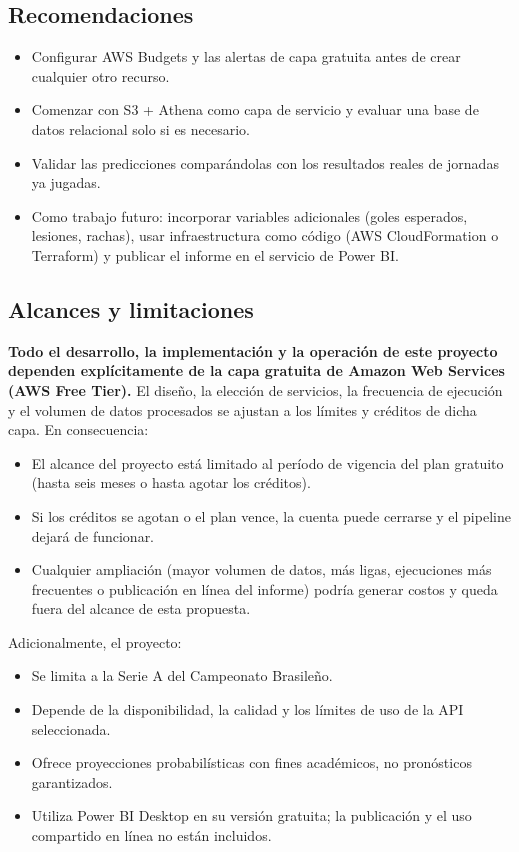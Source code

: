 \documentclass[11pt,a4paper]{article}
\begin{document}
\subsection{Recomendaciones}
\begin{itemize}
  \item Configurar AWS Budgets y las alertas de capa gratuita antes de crear cualquier otro recurso.
  \item Comenzar con S3 + Athena como capa de servicio y evaluar una base de datos relacional solo si es necesario.
  \item Validar las predicciones comparándolas con los resultados reales de jornadas ya jugadas.
  \item Como trabajo futuro: incorporar variables adicionales (goles esperados, lesiones, rachas), usar infraestructura como código (AWS CloudFormation o Terraform) y publicar el informe en el servicio de Power BI.
\end{itemize}

\subsection{Alcances y limitaciones}

\begin{alerta}
\textbf{Todo el desarrollo, la implementación y la operación de este proyecto dependen explícitamente de la capa gratuita de Amazon Web Services (AWS Free Tier).} El diseño, la elección de servicios, la frecuencia de ejecución y el volumen de datos procesados se ajustan a los límites y créditos de dicha capa. En consecuencia:
\begin{itemize}
  \item El alcance del proyecto está limitado al período de vigencia del plan gratuito (hasta seis meses o hasta agotar los créditos).
  \item Si los créditos se agotan o el plan vence, la cuenta puede cerrarse y el pipeline dejará de funcionar.
  \item Cualquier ampliación (mayor volumen de datos, más ligas, ejecuciones más frecuentes o publicación en línea del informe) podría generar costos y queda fuera del alcance de esta propuesta.
\end{itemize}
\end{alerta}

\noindent Adicionalmente, el proyecto:
\begin{itemize}
  \item Se limita a la Serie A del Campeonato Brasileño.
  \item Depende de la disponibilidad, la calidad y los límites de uso de la API seleccionada.
  \item Ofrece proyecciones probabilísticas con fines académicos, no pronósticos garantizados.
  \item Utiliza Power BI Desktop en su versión gratuita; la publicación y el uso compartido en línea no están incluidos.
\end{itemize}
\end{document}
